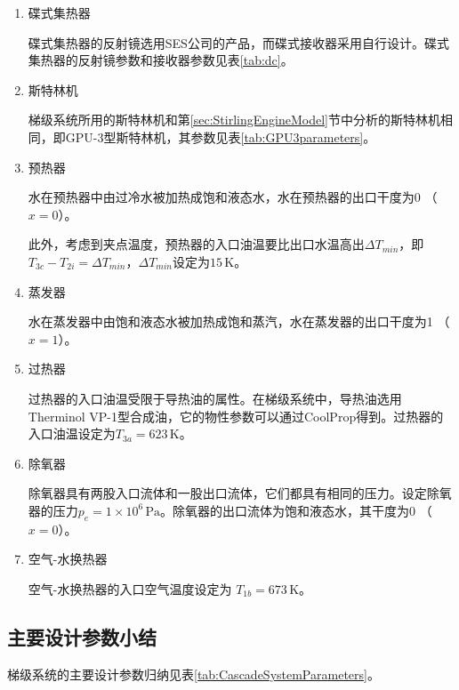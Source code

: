 \begin{enumerate}[label=(\arabic*)]
\item 碟式集热器

碟式集热器的反射镜选用SES公司的产品，而碟式接收器采用自行设计。碟式集热器的反射镜参数和接收器参数见表\ref{tab:dc}。

\item 斯特林机

梯级系统所用的斯特林机和第\ref{sec:StirlingEngineModel}节中分析的斯特林机相同，即GPU-3型斯特林机，其参数见表\ref{tab:GPU3parameters}。

\item 预热器

水在预热器中由过冷水被加热成饱和液态水，水在预热器的出口干度为0 （$x = 0$）。

此外，考虑到夹点温度，预热器的入口油温要比出口水温高出$\Delta T_{min}$，即$T_{3c} - T_{2i} = \Delta T_{min}$，$\Delta T_{min}$设定为$15\,\mathrm{K}$。

\item 蒸发器

水在蒸发器中由饱和液态水被加热成饱和蒸汽，水在蒸发器的出口干度为1 （$x = 1$）。

\item 过热器

过热器的入口油温受限于导热油的属性。在梯级系统中，导热油选用Therminol VP-1型合成油，它的物性参数可以通过CoolProp得到。过热器的入口油温设定为$T_{3a} = 623\,\mathrm{K}$。

\item 除氧器

除氧器具有两股入口流体和一股出口流体，它们都具有相同的压力。设定除氧器的压力$p_e = 1\times10^6\,\mathrm{Pa}$。除氧器的出口流体为饱和液态水，其干度为0 （$x = 0$）。

\item 空气-水换热器

空气-水换热器的入口空气温度设定为 $T_{1b} = 673\,\mathrm{K}$。
\end{enumerate}

\subsection{主要设计参数小结}
梯级系统的主要设计参数归纳见表\ref{tab:CascadeSystemParameters}。


